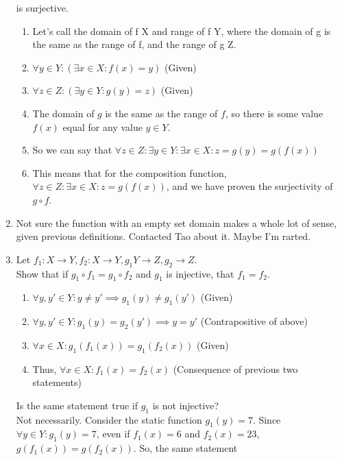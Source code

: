 \documentclass{article}
\begin{document}
\begin{enumerate}
            is surjective.
            \begin{enumerate}
                \item Let's call the domain of f X and range of f Y, where the domain of g is the same as the range of f, and the range of g Z.
                \item $\forall y \in Y: (\exists x \in X: f(x) = y)$ (Given)
                \item $\forall z \in Z: (\exists y \in Y: g(y) = z)$ (Given)
                \item The domain of $g$ is the same as the range of $f$, so there is some value $f(x)$ equal for any value $y \in Y$.
                \item So we can say that $\forall z \in Z: \exists y \in Y: \exists x \in X: z = g(y) = g(f(x))$
                \item This means that for the composition function, $\forall z \in Z: \exists x \in X: z = g(f(x))$, and we have proven the
                    surjectivity of $g \circ f$.
            \end{enumerate}
        \item Not sure the function with an empty set domain makes a whole lot of sense, given previous definitions. Contacted Tao about it. Maybe I'm rarted.
        \item Let $f_1: X \rightarrow Y, f_2: X \rightarrow Y, g_1 Y \rightarrow Z, g_2 \rightarrow Z$. \\
            Show that if $g_1 \circ f_1 = g_1 \circ f_2$ and $g_1$ is injective, that $f_1 = f_2$.
            \begin{enumerate}
                \item $\forall y,y' \in Y: y \neq y' \implies g_1(y) \neq g_1(y')$ (Given)
                \item $\forall y,y' \in Y: g_1(y) = g_2(y') \implies y = y'$ (Contrapositive of above)
                \item $\forall x \in X: g_1(f_1(x)) = g_1(f_2(x))$ (Given)
                \item Thus, $\forall x \in X: f_1(x) = f_2(x)$ (Consequence of previous two statements)
            \end{enumerate}
            Is the same statement true if $g_1$ is not injective? \\
            Not necessarily. Consider the static function $g_1(y) = 7$.
            Since $\forall y \in Y: g_1(y) = 7$, even if $f_1(x) = 6$ and
            $f_2(x) = 23$, $g(f_1(x)) = g(f_2(x))$. So, the same statement

\end{enumerate}
\end{document}
